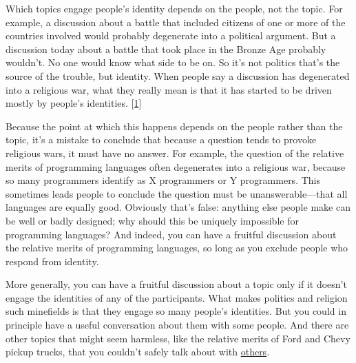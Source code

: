 Which topics engage people's identity
                  depends on the people, not the topic. For example, a
                  discussion about a battle that included citizens of one or
                  more of the countries involved would probably degenerate into
                  a political argument. But a discussion today about a battle
                  that took place in the Bronze Age probably wouldn't. No one
                  would know what side to be on. So it's not politics that's the
                  source of the trouble, but identity. When people say a
                  discussion has degenerated into a religious war, what they
                  really mean is that it has started to be driven mostly by
                  people's identities.
                  [\href{\#f1n}{1}]

Because the point at which this happens depends
                  on the people rather than the topic, it's a mistake to
                  conclude that because a question tends to provoke religious
                  wars, it must have no answer. For example, the question of the
                  relative merits of programming languages often degenerates
                  into a religious war, because so many programmers identify as
                  X programmers or Y programmers. This sometimes leads people to
                  conclude the question must be unanswerable---that all
                  languages are equally good. Obviously that's false: anything
                  else people make can be well or badly designed; why should
                  this be uniquely impossible for programming languages? And
                  indeed, you can have a fruitful discussion about the relative
                  merits of programming languages, so long as you exclude people
                  who respond from identity.

More generally, you can
                  have a fruitful discussion about a topic only if it doesn't
                  engage the identities of any of the participants. What makes
                  politics and religion such minefields is that they engage so
                  many people's identities. But you could in principle have a
                  useful conversation about them with some people. And there are
                  other topics that might seem harmless, like the relative
                  merits of Ford and Chevy pickup trucks, that you couldn't
                  safely talk about with
                  \href{http://www.theledger.com/apps/pbcs.dll/article?AID=/20060418/NEWS/604180378/1039}{others}.

